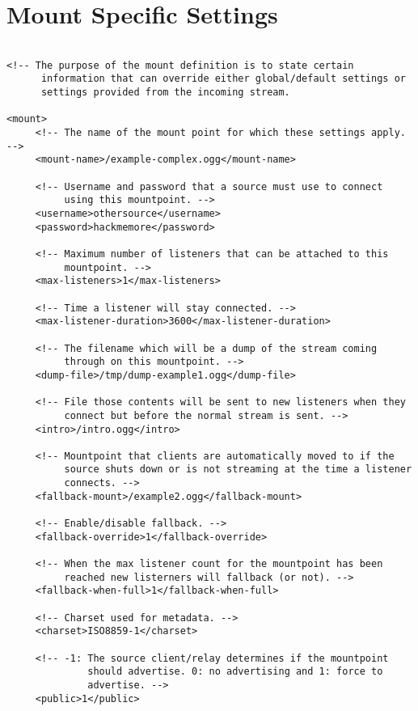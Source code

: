 

\section{Mount Specific Settings}
\begin{lstlisting}

<!-- The purpose of the mount definition is to state certain
      information that can override either global/default settings or
      settings provided from the incoming stream.

<mount>
     <!-- The name of the mount point for which these settings apply. -->
     <mount-name>/example-complex.ogg</mount-name>

     <!-- Username and password that a source must use to connect
          using this mountpoint. -->
     <username>othersource</username>
     <password>hackmemore</password>

     <!-- Maximum number of listeners that can be attached to this
          mountpoint. -->
     <max-listeners>1</max-listeners>

     <!-- Time a listener will stay connected. -->
     <max-listener-duration>3600</max-listener-duration>

     <!-- The filename which will be a dump of the stream coming
          through on this mountpoint. -->
     <dump-file>/tmp/dump-example1.ogg</dump-file>

     <!-- File those contents will be sent to new listeners when they
          connect but before the normal stream is sent. -->
     <intro>/intro.ogg</intro>

     <!-- Mountpoint that clients are automatically moved to if the
          source shuts down or is not streaming at the time a listener
          connects. -->
     <fallback-mount>/example2.ogg</fallback-mount>

     <!-- Enable/disable fallback. -->
     <fallback-override>1</fallback-override>

     <!-- When the max listener count for the mountpoint has been
          reached new listerners will fallback (or not). -->
     <fallback-when-full>1</fallback-when-full>

     <!-- Charset used for metadata. -->
     <charset>ISO8859-1</charset>

     <!-- -1: The source client/relay determines if the mountpoint
              should advertise. 0: no advertising and 1: force to
              advertise. -->
     <public>1</public>


\end{lstlisting}
